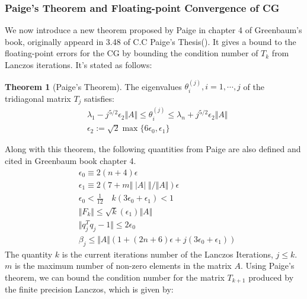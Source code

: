 \documentclass[]{article}
\theoremstyle{definition}
\newtheorem{theorem}{Theorem}            %
\begin{document}
        \subsubsection{Paige's Theorem and Floating-point Convergence of CG}
            We now introduce a new theorem proposed by Paige in chapter 4 of Greenbaum's book\cite{book:greenbaum}, originally appeard in 3.48 of C.C Paige's Thesis(\cite{paper:paige1980}). It gives a bound to the floating-point errors for the CG by bounding the condition number of $T_k$ from Lanczos iterations. It's stated as follows: 
            \begin{theorem}[Paige's Theorem]\label{theorem:paige1}
                The eigenvalues $\theta_i^{(j)}, i = 1, \cdots, j$ of the tridiagonal matrix $T_j$ satisfies: 
                \begin{align}
                    & 
                    \lambda_1 - j^{5/2}\epsilon_2\Vert A\Vert 
                    \le \theta_i^{(j)}
                    \le 
                    \lambda_n + j^{5/2}\epsilon_2\Vert A\Vert
                    \\
                    &
                    \epsilon_2 := \sqrt{2}\max\{6\epsilon_0, \epsilon_1\}
                \end{align}
            \end{theorem}
            Along with this theorem, the following quantities from Paige are also defined and cited in Greenbaum book chapter 4. 
            \begin{align}
                & \epsilon_0 \equiv 2(n + 4)\epsilon
                \\
                & \epsilon_1 \equiv 2(7 + m \Vert  \;|A|\;\Vert/\Vert A\Vert)\epsilon
                \\
                & \epsilon_0 < \frac{1}{12} \quad k(3\epsilon_0 + \epsilon_1) < 1
                \\
                & \Vert F_k\Vert \le \sqrt{k}(\epsilon_1) \Vert A\Vert
                \\
                & \Vert q^T_jq_j -1\Vert \le 2\epsilon_0
                \\
                & \beta_j \le \Vert A\Vert(1 + (2n + 6)\epsilon + j(3\epsilon_0 + \epsilon_1))
            \end{align}
            The quantity $k$ is the current iterations number of the Lanczos Iterations, $j\le k$. $m$ is the maximum number of non-zero elements in the matrix $A$. 
            Using Paige's theorem, we can bound the condition number for the matrix $T_{k + 1}$ produced by the finite precision Lanczos, which is given by: 
\end{document}
